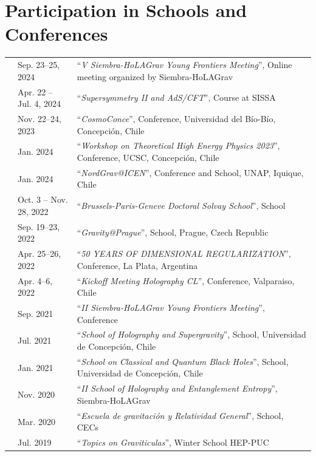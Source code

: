 \documentclass[11pt]{article}
\newenvironment{cvblock}[3]
{
\noindent
\begin{longtable}{p{#1}  >{\raggedright\arraybackslash}p{#2} p{#3}}
}
{
\end{longtable}
}
\newcommand{\cventry}[3]{\textbf{#1} & #2 & #3 \\ }
\newcommand{\event}[2]{\small “\textit{#1}”, #2\vspace{0.2cm}}
\begin{document}
\section*{Participation in Schools and Conferences}
\begin{cvblock}{0cm}{3.5cm}{12cm}
\cventry{}{\small Sep. 23–25, 2024}{\event{V Siembra-HoLAGrav Young Frontiers Meeting}{Online meeting organized by Siembra-HoLAGrav}}

\cventry{}{\small Apr. 22 – Jul. 4, 2024}{\event{Supersymmetry II and AdS/CFT}{Course at SISSA}}

\cventry{}{\small Nov. 22–24, 2023}{\event{CosmoConce}{Conference, Universidad del Bío-Bío, Concepción, Chile}}

\cventry{}{\small Jan. 2024}{\event{Workshop on Theoretical High Energy Physics 2023}{Conference, UCSC, Concepción, Chile}}

\cventry{}{\small Jan. 2024}{\event{NordGrav@ICEN}{Conference and School, UNAP, Iquique, Chile}}

\cventry{}{\small Oct. 3 – Nov. 28, 2022}{\event{Brussels-Paris-Geneve Doctoral Solvay School}{School}}

\cventry{}{\small Sep. 19–23, 2022}{\event{Gravity@Prague}{School, Prague, Czech Republic}}

\cventry{}{\small Apr. 25–26, 2022}{\event{50 YEARS OF DIMENSIONAL REGULARIZATION}{Conference, La Plata, Argentina}}

\cventry{}{\small Apr. 4–6, 2022}{\event{Kickoff Meeting Holography CL}{Conference, Valparaiso, Chile}}

\cventry{}{\small Sep. 2021}{\event{II Siembra-HoLAGrav Young Frontiers Meeting}{Conference}}

\cventry{}{\small Jul. 2021}{\event{School of Holography and Supergravity}{School, Universidad de Concepción, Chile}}

\cventry{}{\small Jan. 2021}{\event{School on Classical and Quantum Black Holes}{School, Universidad de Concepción, Chile}}

\cventry{}{\small Nov. 2020}{\event{II School of Holography and Entanglement Entropy}{Siembra-HoLAGrav}}

\cventry{}{\small Mar. 2020}{\event{Escuela de gravitación y Relatividad General}{School, CECs}}

\cventry{}{\small Jul. 2019}{\event{Topics on Graviticulas}{Winter School HEP-PUC}}

\end{cvblock}
\end{document}
